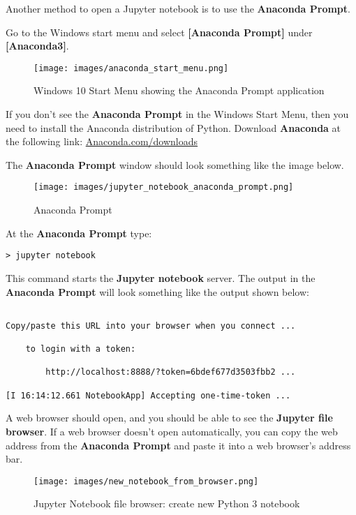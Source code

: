 \documentclass{book}
\makeatletter
\def\maxwidth{\ifdim\Gin@nat@width>\linewidth\linewidth
\else\Gin@nat@width\fi}
\let\Oldincludegraphics\includegraphics
\renewcommand{\includegraphics}[1]{\Oldincludegraphics[width=.8\maxwidth]{#1}}
\makeatother
\begin{document}
    
        Another method to open a Jupyter notebook is to use the \textbf{Anaconda
Prompt}.

Go to the Windows start menu and select \textbf{{[}Anaconda Prompt{]}}
under \textbf{{[}Anaconda3{]}}.

\begin{figure}
\centering
\texttt{[image: images/anaconda\_start\_menu.png]}
\caption{Windows 10 Start Menu showing the Anaconda Prompt application}
\end{figure}

If you don't see the \textbf{Anaconda Prompt} in the Windows Start Menu,
then you need to install the Anaconda distribution of Python. Download
\textbf{Anaconda} at the following link:
\href{https://www.anaconda.com/download/}{Anaconda.com/downloads}

The \textbf{Anaconda Prompt} window should look something like the image
below.

\begin{figure}
\centering
\texttt{[image: images/jupyter\_notebook\_anaconda\_prompt.png]}
\caption{Anaconda Prompt}
\end{figure}

At the \textbf{Anaconda Prompt} type:

\begin{lstlisting}
> jupyter notebook
\end{lstlisting}

This command starts the \textbf{Jupyter notebook} server. The output in
the \textbf{Anaconda Prompt} will look something like the output shown
below:

\begin{lstlisting}

Copy/paste this URL into your browser when you connect ...

    to login with a token:

        http://localhost:8888/?token=6bdef677d3503fbb2 ...

[I 16:14:12.661 NotebookApp] Accepting one-time-token ...
\end{lstlisting}

A web browser should open, and you should be able to see the
\textbf{Jupyter file browser}. If a web browser doesn't open
automatically, you can copy the web address from the \textbf{Anaconda
Prompt} and paste it into a web browser's address bar.

\begin{figure}
\centering
\texttt{[image: images/new\_notebook\_from\_browser.png]}
\caption{Jupyter Notebook file browser: create new Python 3 notebook}
\end{figure}
\end{document}
